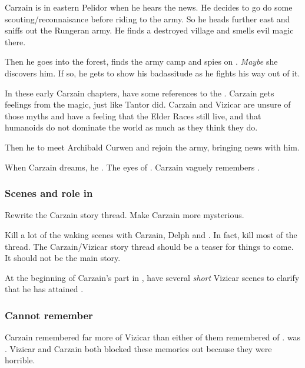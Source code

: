 Carzain is in eastern Pelidor when he hears the news. 
He decides to go do some scouting/reconnaisance before riding to the army. 
So he heads further east and sniffs out the Rungeran army. 
He finds a destroyed village and smells evil magic there. 

Then he goes into the forest, finds the army camp and spies on \Takestsha. 
\emph{Maybe} she discovers him. 
If so, he gets to show his badassitude as he fights his way out of it. 

In these early Carzain chapters, have some references to the . 
Carzain gets  feelings from the \EreshKali{} magic, just like Tantor did. 
Carzain and Vizicar are unsure of those myths and have a feeling that the Elder Races still live, and that humanoids do not dominate the world as much as they think they do. 

Then he  to meet Archibald Curwen and rejoin the army, bringing news with him. 

When Carzain dreams, he . 
The eyes of \Nexagglachel. 
Carzain vaguely remembers . 






\subsubsection{Scenes and role in \TwilightAngelRememberEmph}
Rewrite the Carzain story thread. 
Make Carzain more mysterious. 

Kill a lot of the waking scenes with Carzain, Delph and \Tsekkect. 
In fact, kill most of the thread. 
The Carzain/Vizicar story thread should be a teaser for things to come.
It should not be the main story. 

At the beginning of Carzain's part in \TwilightAngelRememberEmph, have several \emph{short} Vizicar scenes to clarify that he has attained \kenosis. 







\subsubsection{Cannot remember \Tydesmos}
Carzain remembered far more of Vizicar than either of them remembered of \Tydesmos. 
\Tydesmos was .
Vizicar and Carzain both blocked these memories out because they were horrible. 

